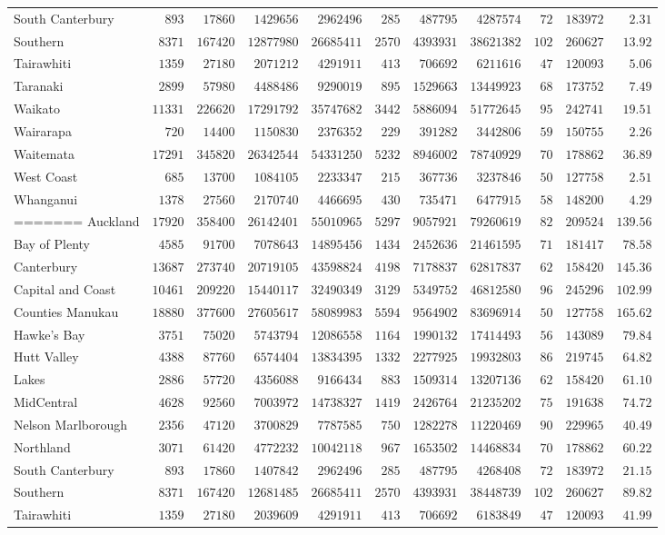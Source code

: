 \documentclass{article}
\begin{document}
\begin{itemize}
\begin{table}
\begin{center}
\begin{tabular}{lrrrrrrrrrr}
South Canterbury&$  893$&$ 17860$&$ 1429656$&$ 2962496$&$ 285$&$ 487795$&$ 4287574$&$ 72$&$183972$&$ 2.31$\tabularnewline
Southern&$ 8371$&$167420$&$12877980$&$26685411$&$2570$&$4393931$&$38621382$&$102$&$260627$&$13.92$\tabularnewline
Tairawhiti&$ 1359$&$ 27180$&$ 2071212$&$ 4291911$&$ 413$&$ 706692$&$ 6211616$&$ 47$&$120093$&$ 5.06$\tabularnewline
Taranaki&$ 2899$&$ 57980$&$ 4488486$&$ 9290019$&$ 895$&$1529663$&$13449923$&$ 68$&$173752$&$ 7.49$\tabularnewline
Waikato&$11331$&$226620$&$17291792$&$35747682$&$3442$&$5886094$&$51772645$&$ 95$&$242741$&$19.51$\tabularnewline
Wairarapa&$  720$&$ 14400$&$ 1150830$&$ 2376352$&$ 229$&$ 391282$&$ 3442806$&$ 59$&$150755$&$ 2.26$\tabularnewline
Waitemata&$17291$&$345820$&$26342544$&$54331250$&$5232$&$8946002$&$78740929$&$ 70$&$178862$&$36.89$\tabularnewline
West Coast&$  685$&$ 13700$&$ 1084105$&$ 2233347$&$ 215$&$ 367736$&$ 3237846$&$ 50$&$127758$&$ 2.51$\tabularnewline
Whanganui&$ 1378$&$ 27560$&$ 2170740$&$ 4466695$&$ 430$&$ 735471$&$ 6477915$&$ 58$&$148200$&$ 4.29$\tabularnewline
=======
Auckland&$17920$&$358400$&$26142401$&$55010965$&$5297$&$9057921$&$79260619$&$ 82$&$209524$&$139.56$\tabularnewline
Bay of Plenty&$ 4585$&$ 91700$&$ 7078643$&$14895456$&$1434$&$2452636$&$21461595$&$ 71$&$181417$&$ 78.58$\tabularnewline
Canterbury&$13687$&$273740$&$20719105$&$43598824$&$4198$&$7178837$&$62817837$&$ 62$&$158420$&$145.36$\tabularnewline
Capital and Coast&$10461$&$209220$&$15440117$&$32490349$&$3129$&$5349752$&$46812580$&$ 96$&$245296$&$102.99$\tabularnewline
Counties Manukau&$18880$&$377600$&$27605617$&$58089983$&$5594$&$9564902$&$83696914$&$ 50$&$127758$&$165.62$\tabularnewline
Hawke's Bay&$ 3751$&$ 75020$&$ 5743794$&$12086558$&$1164$&$1990132$&$17414493$&$ 56$&$143089$&$ 79.84$\tabularnewline
Hutt Valley&$ 4388$&$ 87760$&$ 6574404$&$13834395$&$1332$&$2277925$&$19932803$&$ 86$&$219745$&$ 64.82$\tabularnewline
Lakes&$ 2886$&$ 57720$&$ 4356088$&$ 9166434$&$ 883$&$1509314$&$13207136$&$ 62$&$158420$&$ 61.10$\tabularnewline
MidCentral&$ 4628$&$ 92560$&$ 7003972$&$14738327$&$1419$&$2426764$&$21235202$&$ 75$&$191638$&$ 74.72$\tabularnewline
Nelson Marlborough&$ 2356$&$ 47120$&$ 3700829$&$ 7787585$&$ 750$&$1282278$&$11220469$&$ 90$&$229965$&$ 40.49$\tabularnewline
Northland&$ 3071$&$ 61420$&$ 4772232$&$10042118$&$ 967$&$1653502$&$14468834$&$ 70$&$178862$&$ 60.22$\tabularnewline
South Canterbury&$  893$&$ 17860$&$ 1407842$&$ 2962496$&$ 285$&$ 487795$&$ 4268408$&$ 72$&$183972$&$ 21.15$\tabularnewline
Southern&$ 8371$&$167420$&$12681485$&$26685411$&$2570$&$4393931$&$38448739$&$102$&$260627$&$ 89.82$\tabularnewline
Tairawhiti&$ 1359$&$ 27180$&$ 2039609$&$ 4291911$&$ 413$&$ 706692$&$ 6183849$&$ 47$&$120093$&$ 41.99$\tabularnewline

\end{tabular}
\end{center}
\end{table}
\end{itemize}
\end{document}
